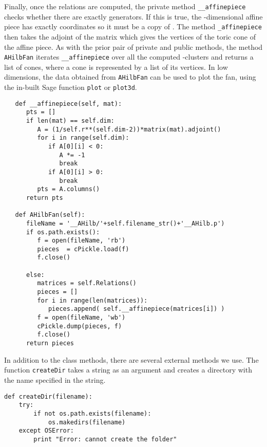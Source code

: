 \vspace{5pt}

\noindent Finally, once the relations are computed, the private method \texttt{\_\_affinepiece} checks whether there are exactly  generators. If this is true, the -dimensional affine piece has exactly  coordinates so it must be a copy of . The method \texttt{\_affinepiece} then takes the adjoint of the matrix which gives the vertices of the toric cone of the affine piece. As with the prior pair of private and public methods, the method \texttt{AHilbFan} iterates \texttt{\_\_affinepiece} over all the computed -clusters and returns a list of cones, where a cone is represented by a list of its vertices. In low dimensions, the data obtained from \texttt{AHilbFan} can be used to plot the fan, using the in-built Sage function \texttt{plot} or \texttt{plot3d}.

\vspace{5pt}

\singlespacing
\begin{verbatim}
   def __affinepiece(self, mat):
      pts = []
      if len(mat) == self.dim:
         A = (1/self.r**(self.dim-2))*matrix(mat).adjoint()
         for i in range(self.dim):
            if A[0][i] < 0:
               A *= -1
               break
            if A[0][i] > 0:
               break
         pts = A.columns()
      return pts

   def AHilbFan(self):
      fileName = '__AHilb/'+self.filename_str()+'__AHilb.p')
      if os.path.exists():
         f = open(fileName, 'rb')
         pieces  = cPickle.load(f)
         f.close()

      else:
         matrices = self.Relations()
         pieces = []
         for i in range(len(matrices)):
            pieces.append( self.__affinepiece(matrices[i]) )
         f = open(fileName, 'wb')
         cPickle.dump(pieces, f)
         f.close()
      return pieces
\end{verbatim}

In addition to the class methods, there are several external methods we use. The function \texttt{createDir} takes a string as an argument and creates a directory with the name specified in the string.

\vspace{-20pt}
\singlespace
\begin{verbatim}
def createDir(filename):
	try:
		if not os.path.exists(filename):
			os.makedirs(filename)
	except OSError:
		print "Error: cannot create the folder"
\end{verbatim} 

